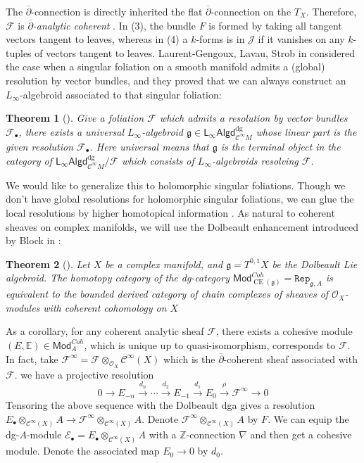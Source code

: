\documentclass[12pt]{amsart}
\newtheorem{thm}{Theorem}[section]
\theoremstyle{definition}
\theoremstyle{remark}
\numberwithin{equation}{section}
\newcommand{\delb}{\overline{\partial}}
\newcommand{\CF}{{\mathcal F}}
\newcommand{\CO}{{\mathcal O}}
\newcommand{\cinf}{{\mathcal C}^{\infty}}
\newcommand{\Z}{{\mathbb{Z}}}
\newcommand{\1}{{\mathbb{1}}}
\newcommand{\E}{{\mathcal{E}}}
\newcommand{\g}{\mathfrak{g}}
\newcommand{\CE}{\operatorname{CE}}
\newcommand{\cohmod}{\mathsf{Mod}^{Coh}}
\newcommand{\repi}{\mathtt{Rep}}
\newcommand{\lalgd}{\mathsf{L_{\infty}Algd}^{\operatorname{dg}}}
\newcommand{\bt}{\bullet}
\begin{document}
The $\delb$-connection is directly inherited the flat $\delb$-connection on the $T_X$. Therefore, $\CF$ is {\it $\delb$-analytic coherent} \index{coherent!$\delb$-analytic}. In (3), the bundle $F$ is formed by taking all tangent vectors tangent to leaves, whereas in (4) a $k$-forms is in $\mathcal{J}$ if it vanishes on any $k$-tuples of vectors tangent to leaves.
Laurent-Gengoux, Lavau, Strob in \cite{LLS20} considered the case when a singular foliation on a smooth manifold admits a (global) resolution by vector bundles, and they proved that we can always construct an $L_{\infty}$-algebroid associated to that singular foliation:
\begin{thm}[\cite{LLS20}]
Give a foliation $\CF$ which admits a resolution by vector bundles $\CF_{\bt}$, there exists a {\it {universal} $L_{\infty}$}-algebroid  $\g \in \lalgd_{\cinf{M}}$ whose linear part is the given resolution $\CF_{\bt}$. Here universal means that $\g$ is the terminal object in the category of $\lalgd_{\cinf{M}}/\CF$ which consists of $L_{\infty}$-algebroids resolving $\CF$. 
\end{thm}
We would like to generalize this to holomorphic singular foliations. 
Though we don't have global resolutions for holomorphic singular foliations, we can glue the local resolutions by higher homotopical information \cite{TT76}\cite{TT78}\cite{Blo05}\cite{Wei16}. As natural to coherent sheaves on complex manifolds, we will use the Dolbeault enhancement introduced by Block in \cite{Blo05}:

\begin{thm}[\cite{Blo05}]
	Let $X$ be a complex manifold, and $\g = T^{0, 1} X$ be the Dolbeault Lie algebroid. The homotopy category of the dg-category $\cohmod_{\CE(\g)}=\repi_{\g,A}$ is equivalent to the bounded derived category of chain complexes of sheaves of $\CO_X$-modules with coherent cohomology on 
	$X$
	
\end{thm}
As a corollary, for any coherent analytic sheaf $\CF$, there exists a cohesive module $(E, \mathbb{E})\in \cohmod_{A}$, which is unique up to quasi-isomorphism, corresponds to $\CF$. In fact, take $\CF^{\infty} = \CF \otimes_{\CO_X} \cinf(X)$ which is the $\delb$-coherent sheaf associated with $\CF$. we have a projective resolution
\begin{equation*}
0\to  E_{-n} \stackrel{d_n}{\longrightarrow}  \cdots \stackrel{d_2}{\longrightarrow} E_{-1} \stackrel{d_1}{\longrightarrow} E_{0} \stackrel{\rho}{\longrightarrow} \CF^{\infty} \longrightarrow 0
\end{equation*}
Tensoring the above sequence with the Dolbeault dga gives a resolution $E_{\bullet}\otimes_{\cinf(X)}A\to \CF^{\infty}\otimes_{\cinf(X)}A$. Denote   $\CF^{\infty}\otimes_{\cinf(X)}A$ by $F$. We can equip the dg-$A$-module $\E_{\bullet}=E_{\bullet}\otimes_{\cinf(X)}A$ with a $\Z$-connection $\nabla$ and then get a cohesive module. Denote the associated map $E_0 \to 0$ by $d_0$.
\end{document}
